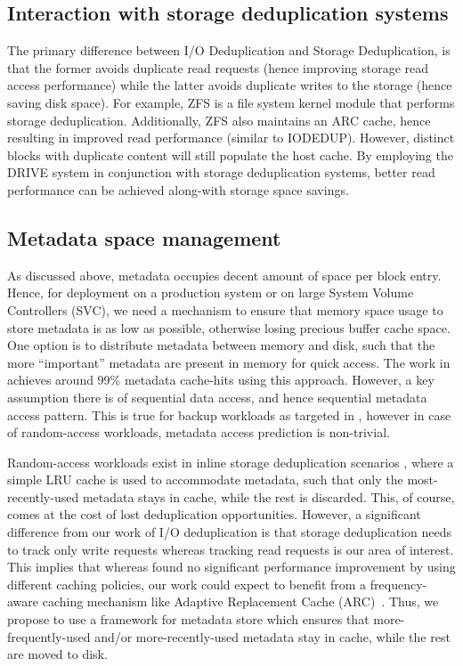\subsection{Interaction with storage deduplication systems}
The primary difference between I/O Deduplication and Storage 
Deduplication\cite{idedup,dede,zfs}, 
is that the former avoids duplicate read requests 
(hence improving storage read access performance) 
while the latter avoids duplicate writes to the storage
(hence saving disk space). 
For example, ZFS\cite{zfs} 
is a file system kernel module that performs 
storage deduplication. 
Additionally, ZFS also maintains an ARC cache, hence resulting 
in improved read performance (similar to IODEDUP). However, distinct 
blocks with duplicate content will still populate the host cache. By
employing the DRIVE system in conjunction with storage deduplication
systems, better read performance can be achieved along-with 
storage space savings.


\subsection{Metadata space management}
As discussed above, metadata occupies decent amount of space per block entry.
Hence, for deployment on a production system or on large System Volume
Controllers (SVC), we need a 
mechanism to ensure that memory space usage to store metadata is as low
as possible, otherwise losing precious buffer cache space. 
One option is to distribute metadata between memory and disk, such that 
the more ``important'' metadata are present in memory for quick 
access. The work in \cite{data-domain} achieves around 99\% 
metadata cache-hits using this approach. However, a key assumption 
there is of sequential data access, and hence sequential metadata access
pattern. This is true for backup workloads as targeted
in \cite{data-domain}, however in case of random-access workloads,
metadata access prediction is non-trivial.

Random-access workloads exist in inline storage deduplication scenarios
\cite{idedup}, where a simple LRU cache is used to accommodate metadata,
such that only the most-recently-used metadata stays in cache, while the
rest is discarded. This, of course, comes at the cost of lost
deduplication opportunities. However, a significant difference from our work
of I/O deduplication is that storage deduplication needs to track only 
write requests whereas tracking read requests is our area of interest. This 
implies that whereas \cite{idedup} found no significant performance 
improvement by using different caching policies, our work
could expect to benefit from a frequency-aware caching mechanism like
Adaptive Replacement Cache (ARC)~\cite{ARC, outperforming-LRU}.
Thus, we propose to use a framework for metadata store which 
ensures that more-frequently-used and/or more-recently-used
metadata stay in cache, while the rest are moved to disk. 

